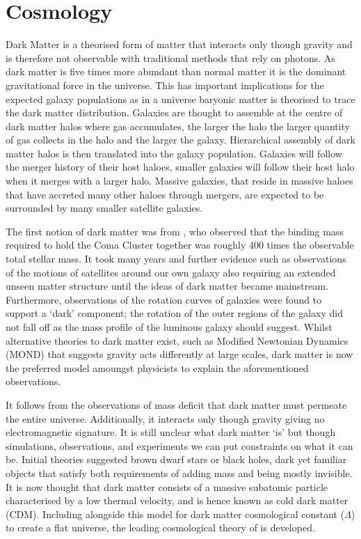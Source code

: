 \section{\LCDM Cosmology}
\label{sec:introLCDM}
Dark Matter is a theorised form of matter that interacts only though gravity and is therefore not observable with traditional methods that rely on photons. As dark matter is five times more abundant than normal matter it is the dominant gravitational force in the universe. This has important implications for the expected galaxy populations as in a \LCDM universe baryonic matter is theorised to trace the dark matter distribution. Galaxies are thought to assemble at the centre of dark matter halos where gas accumulates, the larger the halo the larger quantity of gas collects in the halo and the larger the galaxy. Hierarchical assembly of dark matter halos is then translated into the galaxy population. Galaxies will follow the merger history of their host haloes, smaller galaxies will follow their host halo when it merges with a larger halo. Massive galaxies, that reside in massive haloes that have accreted many other haloes through mergers, are expected to be surrounded by many smaller satellite galaxies.

The first notion of dark matter was from \citet{Zwicky1933DieNebeln}, who observed that the binding mass required to hold the Coma Cluster together was roughly 400 times the observable total stellar mass. It took many years and further evidence such as observations of the motions of satellites around our own galaxy also requiring an extended unseen matter structure until the ideas of dark matter became mainstream. Furthermore, observations of the rotation curves of galaxies \citep{Roberts1973ComparisonTypes} were found to support a `dark' component; the rotation of the outer regions of the galaxy did not fall off as the mass profile of the luminous galaxy should suggest. Whilst alternative theories to dark matter exist, such as Modified Newtonian Dynamics (MOND) that suggests gravity acts differently at large scales, dark matter is now the preferred model amoungst physicists to explain the aforementioned observations. 

It follows from the observations of mass deficit that dark matter must permeate the entire universe. Additionally, it interacts only though gravity giving no electromagnetic signature. It is still unclear what dark matter `is' but though simulations, observations, and experiments we can put constraints on what it can be. Initial theories suggested brown dwarf stars or black holes, dark yet familiar objects that satisfy both requirements of adding mass and being mostly invisible. It is now thought that dark matter consists of a massive subatomic particle characterised by a low thermal velocity, and is hence known as cold dark matter (CDM). Including alongside this model for dark matter cosmological constant ($\Lambda$) to create a flat universe, the leading cosmological theory of \LCDM is developed. 

